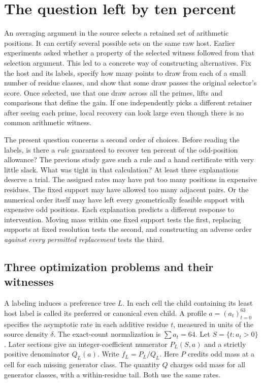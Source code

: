 \documentclass[12pt,letterpaper]{article}
\begin{document}
\section{The question left by ten percent}
\label{sec:question}
An averaging argument in the source selects a retained set of arithmetic positions. It can certify several possible sets on the same raw host. Earlier experiments asked whether a property of the selected witness followed from that selection argument. This led to a concrete way of constructing alternatives. Fix the host and its labels, specify how many points to draw from each of a small number of residue classes, and show that some draw passes the original selector's score. Once selected, use that one draw across all the primes, lifts and comparisons that define the gain. If one independently picks a different retainer after seeing each prime, local recovery can look large even though there is no common arithmetic witness.

The present question concerns a second order of choices. Before reading the labels, is there a \emph{rule} guaranteed to recover ten percent of the odd-position allowance? The previous study gave such a rule and a hand certificate with very little slack. What was tight in that calculation? At least three explanations deserve a trial. The assigned rates may have put too many positions in expensive residues. The fixed support may have allowed too many adjacent pairs. Or the numerical order itself may have left every geometrically feasible support with expensive odd positions. Each explanation predicts a different response to intervention. Moving mass within one fixed support tests the first, replacing supports at fixed resolution tests the second, and constructing an adverse order \emph{against every permitted replacement} tests the third.

\subsection{Three optimization problems and their witnesses}
A labeling induces a preference tree \(L\). In each cell the child containing its least host label is called its preferred or canonical even child. A profile \(a=(a_t)_{t=0}^{63}\) specifies the asymptotic rate in each additive residue \(t\), measured in units of the source density \(\delta\). The exact-count normalization is \(\sum a_t=64\). Let \(S=\{t:a_t>0\}\). Later sections give an integer-coefficient numerator \(P_L(S,a)\) and a strictly positive denominator \(Q_L(a)\). Write \(f_L=P_L/Q_L\). Here \(P\) credits odd mass at a cell for each missing generator class. The quantity \(Q\) charges odd mass for all generator classes, with a within-residue tail. Both use the same rates.
\end{document}
